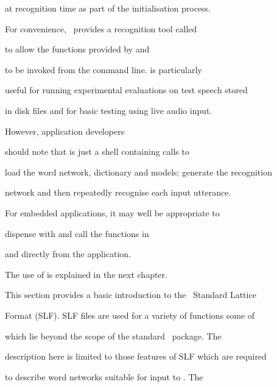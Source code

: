 at recognition time as part of the initialisation process.










For convenience, \HTK\ provides a recognition tool called 


to allow the functions provided by  and 


to be invoked from the command line.  is particularly


useful for running experimental evaluations on test speech stored


in disk files and for basic testing using live audio input.


However, application developers


should note that  is just a shell containing calls to


load the word network, dictionary and models; generate the recognition


network and then repeatedly recognise each input utterance.


For embedded applications, it may well be appropriate to


dispense with  and call the functions in 


 and  directly from the application.


The use of  is explained in the next chapter.












This section provides a basic introduction to the \HTK\ Standard Lattice


Format (SLF). SLF files are used for a variety of functions some of


which lie beyond the scope of the standard \HTK\ package.   The


description here is limited to those features of SLF which are required


to describe word networks suitable for input to .  The


